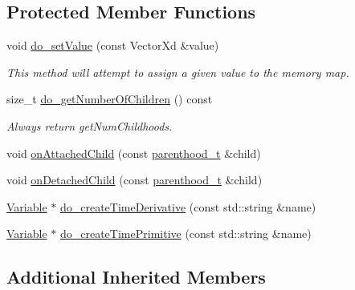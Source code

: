 \subsection*{Protected Member Functions}
\begin{DoxyCompactItemize}
\item 
void \hyperlink{classocra_1_1CompositeVariable_aa2d9ca737bf529e2686ba9a3ee1126e5}{do\+\_\+set\+Value} (const Vector\+Xd \&value)
\begin{DoxyCompactList}\small\item\em This method will attempt to assign a given value to the memory map. \end{DoxyCompactList}\item 
size\+\_\+t \hyperlink{classocra_1_1CompositeVariable_aa61eea64fe90aea3ebccad355a9e8fb0}{do\+\_\+get\+Number\+Of\+Children} () const
\begin{DoxyCompactList}\small\item\em Always return get\+Num\+Childhoods. \end{DoxyCompactList}\end{DoxyCompactItemize}
{\bf }\par
\begin{DoxyCompactItemize}
\item 
void \hyperlink{classocra_1_1CompositeVariable_a995a870aa6b0a9933ebffd975ce6f6a5}{on\+Attached\+Child} (const \hyperlink{classocra_1_1Variable_a88444b2124cf5aab069f46734822f31f}{parenthood\+\_\+t} \&child)
\item 
void \hyperlink{classocra_1_1CompositeVariable_a76b21bf2425a09aded03b3d7a22c8db8}{on\+Detached\+Child} (const \hyperlink{classocra_1_1Variable_a88444b2124cf5aab069f46734822f31f}{parenthood\+\_\+t} \&child)
\end{DoxyCompactItemize}

{\bf }\par
\begin{DoxyCompactItemize}
\item 
\hyperlink{classocra_1_1Variable}{Variable} $\ast$ \hyperlink{classocra_1_1CompositeVariable_a4ac0f033cea1cb5e4bfdb414765c3743}{do\+\_\+create\+Time\+Derivative} (const std\+::string \&name)
\item 
\hyperlink{classocra_1_1Variable}{Variable} $\ast$ \hyperlink{classocra_1_1CompositeVariable_a09fb82df36205326b995aca1dd8f14ba}{do\+\_\+create\+Time\+Primitive} (const std\+::string \&name)
\end{DoxyCompactItemize}

\subsection*{Additional Inherited Members}


